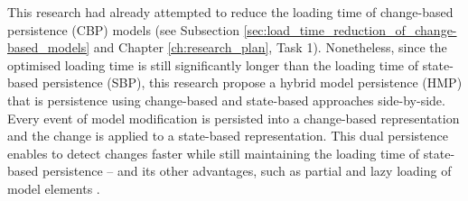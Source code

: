 \documentclass[12pt, a4paper]{report} \usepackage[titletoc]{appendix}
\begin{document}
This research had already attempted to reduce the loading time of change-based persistence (CBP) models (see Subsection \ref{sec:load_time_reduction_of_change-based_models} and Chapter \ref{ch:research_plan}, Task 1). Nonetheless, since the optimised loading time is still significantly longer than the loading time of state-based persistence (SBP), this research propose a hybrid model persistence (HMP) that is persistence using change-based and state-based approaches side-by-side. Every event of model modification is persisted into a change-based representation and the change is applied to a state-based representation. This dual persistence enables to detect changes faster while still maintaining the loading time of state-based persistence -- and its other advantages, such as partial and lazy loading of model elements \cite{ran2016partial,daniel2016neoemf}.  
\end{document}
